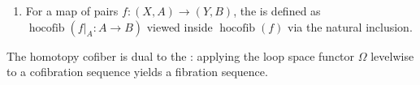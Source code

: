\begin{definition}
\begin{enumerate}
    \item For a map of pairs $f: (X, A) \to (Y, B)$, the  is defined as $\operatorname{hocofib}(f|_A: A \to B)$ viewed inside $\operatorname{hocofib}(f)$ via the natural inclusion.
\end{enumerate}

The homotopy cofiber is dual to the : applying the loop space functor $\Omega$ levelwise to a cofibration sequence yields a fibration sequence.

\end{definition}

